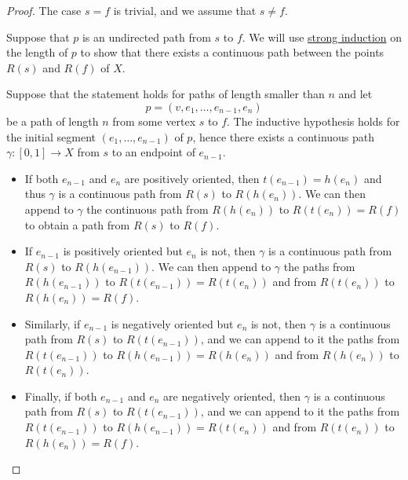 \begin{proof}
  The case \( s = f \) is trivial, and we assume that \( s \neq f \).

   Suppose that \( p \) is an undirected path from \( s \) to \( f \). We will use \hyperref[rem:induction/well_founded]{strong induction} on the length of \( p \) to show that there exists a continuous path between the points \( R(s) \) and \( R(f)  \) of \( X \).

  Suppose that the statement holds for paths of length smaller than \( n \) and let
  \begin{equation*}
    p = (v, e_1, \ldots, e_{n-1}, e_n)
  \end{equation*}
  be a path of length \( n \) from some vertex \( s \) to \( f \). The inductive hypothesis holds for the initial segment \( (e_1, \ldots, e_{n-1}) \) of \( p \), hence there exists a continuous path \( \gamma: [0, 1] \to X \) from \( s \) to an endpoint of \( e_{n-1} \).
  \begin{itemize}
    \item If both \( e_{n-1} \) and \( e_n \) are positively oriented, then \( t(e_{n-1}) = h(e_n) \) and thus \( \gamma \) is a continuous path from \( R(s)  \) to \( R(h(e_n)) \). We can then append to \( \gamma \) the continuous path from \( R(h(e_n)) \) to \( R(t(e_n)) = R(f)  \) to obtain a path from \( R(s)  \) to \( R(f)  \).

    \item If \( e_{n-1} \) is positively oriented but \( e_n \) is not, then \( \gamma \) is a continuous path from \( R(s)  \) to \( R(h(e_{n-1})) \). We can then append to \( \gamma \) the paths from \( R(h(e_{n-1})) \) to \( R(t(e_{n-1})) = R(t(e_n)) \) and from \( R(t(e_n)) \) to \( R(h(e_n)) = R(f)  \).

    \item Similarly, if \( e_{n-1} \) is negatively oriented but \( e_n \) is not, then \( \gamma \) is a continuous path from \( R(s)  \) to \( R(t(e_{n-1})) \), and we can append to it the paths from \( R(t(e_{n-1})) \) to \( R(h(e_{n-1})) = R(h(e_n)) \) and from \( R(h(e_n)) \) to \( R(t(e_n)) \).

    \item Finally, if both \( e_{n-1} \) and \( e_n \) are negatively oriented, then \( \gamma \) is a continuous path from \( R(s)  \) to \( R(t(e_{n-1})) \), and we can append to it the paths from \( R(t(e_{n-1})) \) to \( R(h(e_{n-1})) = R(t(e_n)) \) and from \( R(t(e_n)) \) to \( R(h(e_n)) = R(f)  \).
  \end{itemize}


\end{proof}
